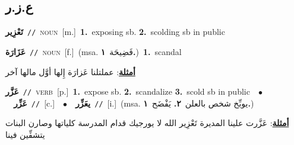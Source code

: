 \documentclass[10pt,a4paper,twoside]{article} %
\begin{document}
\begin{multicols}{2}
\vspace{-3mm}
\subsection*{\color{blue}\foreignlanguage{arabic}{ع.ز.ر}\color{blue}{}} 

{\setlength\topsep{0pt}\textbf{\foreignlanguage{arabic}{تَعْزِير}}\ {\color{gray}\texttt{//}\color{black}}\ \textsc{noun}\ [m.]\ \textbf{1.}~exposing sb.  \textbf{2.}~scolding sb in public\ } \vspace{2mm}

{\setlength\topsep{0pt}\textbf{\foreignlanguage{arabic}{عَزَارَة}}\ {\color{gray}\texttt{//}\color{black}}\ \textsc{noun}\ [f.]\ \color{gray}(msa. \foreignlanguage{arabic}{فَضِيحَة}~\foreignlanguage{arabic}{\textbf{١.}})\color{black}\ \textbf{1.}~scandal\  \begin{flushright}\color{gray}\foreignlanguage{arabic}{\textbf{\underline{\foreignlanguage{arabic}{أمثلة}}}: عملتلنا عَزارَة إِلها أوَّل مالها آخر}\end{flushright}\color{black}} \vspace{2mm}

{\setlength\topsep{0pt}\textbf{\foreignlanguage{arabic}{عَزَّر}}\ {\color{gray}\texttt{//}\color{black}}\ \textsc{verb}\ [p.]\ \textbf{1.}~expose sb.  \textbf{2.}~scandalize  \textbf{3.}~scold sb in public\ \ $\bullet$\ \ \setlength\topsep{0pt}\textbf{\foreignlanguage{arabic}{عَزِّر}}\ {\color{gray}\texttt{//}\color{black}}\ [c.]\ \ $\bullet$\ \ \setlength\topsep{0pt}\textbf{\foreignlanguage{arabic}{يعَزِّر}}\ {\color{gray}\texttt{//}\color{black}}\ [i.]\ \color{gray}(msa. \foreignlanguage{arabic}{يوبِّخ شخص بالعلن}~\foreignlanguage{arabic}{\textbf{٢.}}  \foreignlanguage{arabic}{يَفْضَح}~\foreignlanguage{arabic}{\textbf{١.}})\color{black}\  \begin{flushright}\color{gray}\foreignlanguage{arabic}{\textbf{\underline{\foreignlanguage{arabic}{أمثلة}}}: عَزَّرت علينا المديرة تَعْزِير الله لا يورجيك قدام المدرسة كلياتها وصارن البنات يتشفِّين فينا}\end{flushright}\color{black}} \vspace{2mm}


\end{multicols}
\end{document}
